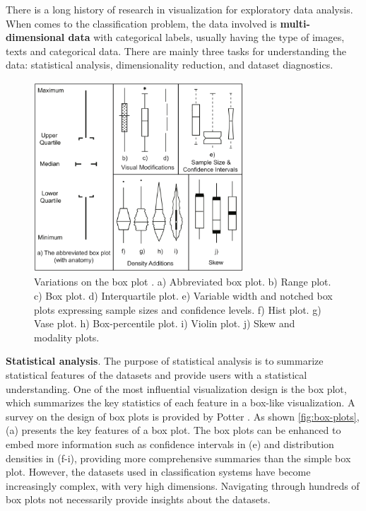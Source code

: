 There is a long history of research in visualization for exploratory data analysis. When comes to the classification problem, the data involved is \textbf{multi-dimensional data} with categorical labels, usually having the type of images, texts and categorical data. There are mainly three tasks for understanding the data: statistical analysis, dimensionality reduction, and dataset diagnostics.

\begin{figure}[hbt]
    \centering
    \includegraphics[width=0.7\textwidth]{figure/box-plots}
    \caption{Variations on the box plot \cite{potter2010statistics}. a) Abbreviated box plot. b) Range plot. c) Box plot. d) Interquartile plot. e) Variable width and notched box plots expressing sample sizes and confidence levels. f) Hist plot. g) Vase plot. h) Box-percentile plot. i) Violin plot. j) Skew and modality plots.}
    \label{fig:box-plots}
\end{figure}

\textbf{Statistical analysis}. The purpose of statistical analysis is to summarize statistical features of the datasets and provide users with a statistical understanding. One of the most influential visualization design is the box plot, which summarizes the key statistics of each feature in a box-like visualization. A survey on the design of box plots is provided by Potter \etal \cite{potter2010statistics}. As shown \autoref{fig:box-plots}, (a) presents the key features of a box plot. The box plots can be enhanced to embed more information such as confidence intervals in (e) and distribution densities in (f-i), providing more comprehensive summaries than the simple box plot. However, the datasets used in classification systems have become increasingly complex, with very high dimensions. Navigating through hundreds of box plots not necessarily provide insights about the datasets.

